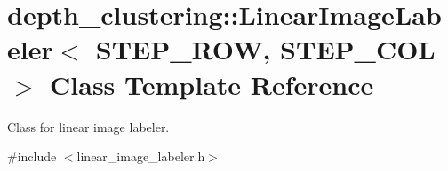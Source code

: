 \hypertarget{classdepth__clustering_1_1LinearImageLabeler}{\section{depth\-\_\-clustering\-:\-:Linear\-Image\-Labeler$<$ S\-T\-E\-P\-\_\-\-R\-O\-W, S\-T\-E\-P\-\_\-\-C\-O\-L $>$ Class Template Reference}
\label{classdepth__clustering_1_1LinearImageLabeler}
}


Class for linear image labeler.  




{\ttfamily \#include $<$linear\-\_\-image\-\_\-labeler.\-h$>$}

